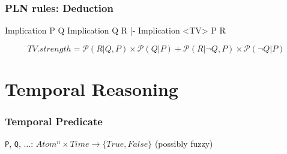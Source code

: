 \documentclass[aspectratio=169]{beamer}
\begin{document}
\begin{frame}[fragile]

  \frametitle{PLN rules: Deduction}
\begin{semiverbatim}
Implication
  P
  Q
Implication
  Q
  R
|-
Implication <TV>
  P
  R
\end{semiverbatim}
$$TV.strength = \mathcal{P}(R|Q,P)\times\mathcal{P}(Q|P) + \mathcal{P}(R|¬Q,P)\times\mathcal{P}(¬Q|P)$$
\end{frame}

\section{Temporal Reasoning}

\begin{frame}
  \frametitle{Temporal Predicate}
\texttt{P}, \texttt{Q}, $\hdots$: $Atom^n \times Time \rightarrow \{True, False\}$
{\tiny \alert{(possibly fuzzy)}}

\end{frame}
\end{document}

